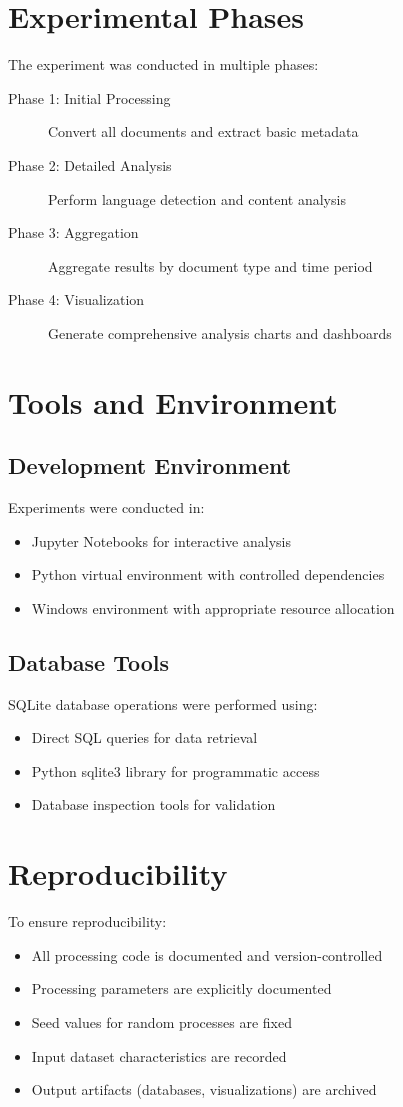 \section{Experimental Phases}
%
The experiment was conducted in multiple phases:

\begin{description}
    \item[Phase 1: Initial Processing] Convert all documents and extract basic metadata
    \item[Phase 2: Detailed Analysis] Perform language detection and content analysis
    \item[Phase 3: Aggregation] Aggregate results by document type and time period
    \item[Phase 4: Visualization] Generate comprehensive analysis charts and dashboards
\end{description}

\section{Tools and Environment}
%
\subsection{Development Environment}
%
Experiments were conducted in:
\begin{itemize}
    \item Jupyter Notebooks for interactive analysis
    \item Python virtual environment with controlled dependencies
    \item Windows environment with appropriate resource allocation
\end{itemize}

\subsection{Database Tools}
%
SQLite database operations were performed using:
\begin{itemize}
    \item Direct SQL queries for data retrieval
    \item Python sqlite3 library for programmatic access
    \item Database inspection tools for validation
\end{itemize}

\section{Reproducibility}
%
To ensure reproducibility:
\begin{itemize}
    \item All processing code is documented and version-controlled
    \item Processing parameters are explicitly documented
    \item Seed values for random processes are fixed
    \item Input dataset characteristics are recorded
    \item Output artifacts (databases, visualizations) are archived
\end{itemize}
